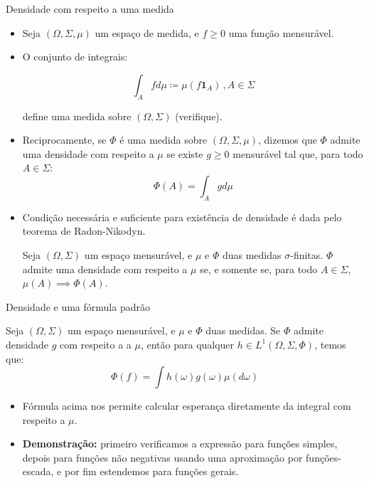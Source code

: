 \documentclass[11pt]{beamer}
\begin{document}
	\begin{frame}{Densidade com respeito a uma medida}

	\begin{itemize}
		\item 	Seja $(\Omega, \Sigma, \mu)$ um espaço de medida, e $f\geq0$ uma função mensurável.
		\item O conjunto de integrais:
		
		$$\int_{A} f d \mu \coloneqq \mu(f \mathbf{1}_{A})\, , A \in \Sigma$$
		
		define uma medida sobre $(\Omega, \Sigma)$ (verifique).
		\item Reciprocamente, se $\Phi$ é uma medida sobre $(\Omega,\Sigma,\mu)$, dizemos que $\Phi$ admite uma densidade com respeito a $\mu$ se existe $g \geq 0$ mensurável tal que, para todo $A \in \Sigma$:
		$$\Phi(A) = \int_{A} g d \mu$$
		\item Condição necessária e suficiente para existência de densidade é dada pelo teorema de Radon-Nikodyn.
		\begin{theorem}
			Seja $(\Omega,\Sigma)$ um espaço mensurável, e $\mu$ e $\Phi$ duas medidas {\color{red}$\sigma$-finitas}. $\Phi$ admite uma densidade com respeito a $\mu$ se, e somente se, para todo $A \in \Sigma$, $\mu(A) \implies \Phi(A)$.
		\end{theorem}
	\end{itemize}

	\end{frame}
	\begin{frame}{Densidade e uma fórmula padrão}
		\begin{lemma}
			Seja $(\Omega,\Sigma)$ um espaço mensurável, e $\mu$ e $\Phi$ duas medidas.  Se $\Phi$ admite densidade $g$ com respeito a a $\mu$, então para qualquer $h \in L^1(\Omega, \Sigma, \Phi)$, temos que:
			$$\Phi(f) = \int h(\omega) g(\omega) \mu(d\omega)$$
		\end{lemma}
		\begin{itemize}
			\item Fórmula acima nos permite calcular esperança diretamente da integral com respeito a $\mu$.
			\item \textbf{Demonstração:} primeiro verificamos  a expressão para funções simples, depois para funções não negativas usando uma aproximação por funções-escada, e por fim estendemos para funções gerais.
		\end{itemize}
	\end{frame}
\end{document}
